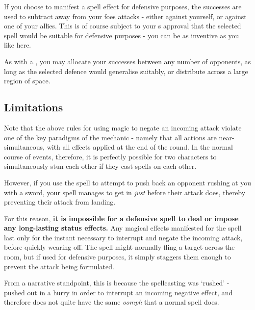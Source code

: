 If you choose to manifest a spell effect for defensive purposes, the successes are used to subtract away from your foes attacks - either against yourself, or against one of your allies. This is of course subject to your s approval that the selected spell would be suitable for defensive purposes - you can be as inventive as you like here. 

As with a , you may allocate your successes between any number of opponents, as long as the selected defence would generalise suitably, or distribute across a large region of space.

\subsection{Limitations}

Note that the above rules for using magic to negate an incoming attack violate one of the key paradigms of the  mechanic - namely that all actions are near-simultaneous, with all effects applied at the end of the round. In the normal course of events, therefore, it is perfectly possible for two characters to simultaneously stun each other if they cast spells on each other. 

However, if you use the  spell to attempt to push back an opponent rushing at you with a sword, your spell manages to get in {\it just} before their attack does, thereby preventing their attack from landing. 

For this reason, {\bf it is impossible for a defensive spell to deal  or impose any long-lasting status effects.} Any magical effects manifested for the spell last only for the instant necessary to interrupt and negate the incoming attack, before quickly wearing off. The  spell might normally fling a target across the room, but if used for defensive purposes, it simply staggers them enough to prevent the attack being formulated. 

From a narrative standpoint, this is because the spellcasting was `rushed' - pushed out in a hurry in order to interrupt an incoming negative effect, and therefore does not quite have the same {\it oomph} that a normal spell does. 
